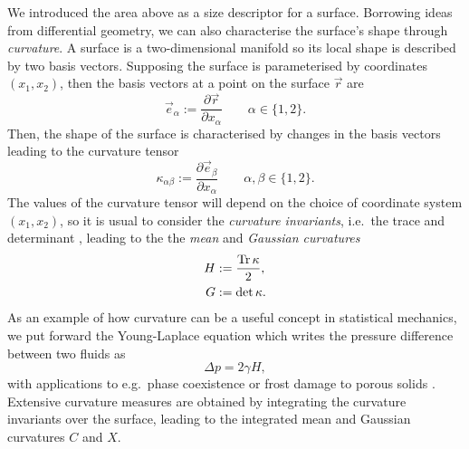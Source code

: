 We introduced the area above as a size descriptor for a surface.
Borrowing ideas from differential geometry, we can also characterise the surface's shape through \emph{curvature}.
A surface is a two-dimensional manifold so its local shape is described by two basis vectors.
Supposing the surface is parameterised by coordinates $(x_1, x_2)$, then the basis vectors at a point on the surface $\vec{r}$ are
\begin{equation}
  \vec{e}_\alpha := \frac{\partial \vec{r}}{\partial x_\alpha}
  \qquad \alpha \in \{1, 2\}.
\end{equation}
Then, the shape of the surface is characterised by changes in the basis vectors leading to the curvature tensor
\begin{equation}
  \kappa_{\alpha \beta} := \frac{\partial \vec{e}_\beta}{\partial x_\alpha}
  \qquad \alpha, \beta \in \{1, 2\}.
\end{equation}
The values of the curvature tensor will depend on the choice of coordinate system $(x_1, x_2)$, so it is usual to consider the \emph{curvature invariants}, i.e.\ the trace and determinant%
,
leading to the the \emph{mean} and \emph{Gaussian curvatures}
\begin{subequations}
  \begin{align}
    H &:= \frac{\operatorname*{Tr}{\kappa}}{2}, \\
    G &:= \det{\kappa}.
  \end{align}
\end{subequations}
As an example of how curvature can be a useful concept in statistical mechanics, we put forward the Young-Laplace equation which writes the pressure difference between two fluids as
\begin{equation*}
  \Delta p = 2 \gamma H,
\end{equation*}
with applications to e.g.\ phase coexistence \cite{YoungPTRSL1805,Laplace1805} or frost damage to porous solids \cite{EverettTFS1961}.
Extensive curvature measures are obtained by integrating the curvature invariants over the surface, leading to the integrated mean and Gaussian curvatures $C$ and $X$.

